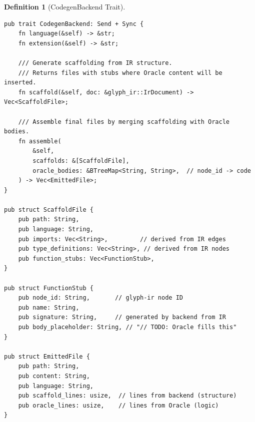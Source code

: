 \documentclass[11pt,a4paper,twoside]{article}
\theoremstyle{definition}
\newtheorem{definition}{Definition}[section]
\theoremstyle{plain}
\theoremstyle{remark}
\begin{document}
\begin{definition}[CodegenBackend Trait]\label{def:backendtrait}
\begin{lstlisting}
pub trait CodegenBackend: Send + Sync {
    fn language(&self) -> &str;
    fn extension(&self) -> &str;

    /// Generate scaffolding from IR structure.
    /// Returns files with stubs where Oracle content will be inserted.
    fn scaffold(&self, doc: &glyph_ir::IrDocument) -> Vec<ScaffoldFile>;

    /// Assemble final files by merging scaffolding with Oracle bodies.
    fn assemble(
        &self,
        scaffolds: &[ScaffoldFile],
        oracle_bodies: &BTreeMap<String, String>,  // node_id -> code
    ) -> Vec<EmittedFile>;
}

pub struct ScaffoldFile {
    pub path: String,
    pub language: String,
    pub imports: Vec<String>,         // derived from IR edges
    pub type_definitions: Vec<String>, // derived from IR nodes
    pub function_stubs: Vec<FunctionStub>,
}

pub struct FunctionStub {
    pub node_id: String,       // glyph-ir node ID
    pub name: String,
    pub signature: String,     // generated by backend from IR
    pub body_placeholder: String, // "// TODO: Oracle fills this"
}

pub struct EmittedFile {
    pub path: String,
    pub content: String,
    pub language: String,
    pub scaffold_lines: usize,  // lines from backend (structure)
    pub oracle_lines: usize,    // lines from Oracle (logic)
}
\end{lstlisting}
\end{definition}
\end{document}

